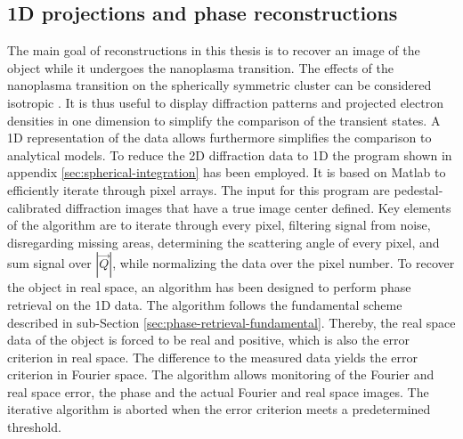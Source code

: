 \subsection{1D projections and phase reconstructions}\label{sec:1d-proj-and-phase-reconstruction}
The main goal of reconstructions in this thesis is to recover an image of the object while it undergoes the nanoplasma transition. The effects of the nanoplasma transition on the spherically symmetric cluster can be considered isotropic \citep{Gorkhover-2016-NatPho}. It is thus useful to display diffraction patterns and projected electron densities in one dimension to simplify the comparison of the transient states. A 1D representation of the data allows furthermore simplifies the comparison to analytical models. To reduce the 2D diffraction data to 1D the program shown in appendix \ref{sec:spherical-integration} has been employed. It is based on Matlab to efficiently iterate through pixel arrays. The input for this program are pedestal-calibrated diffraction images that have a true image center defined. Key elements of the algorithm are to iterate through every pixel, filtering signal from noise, disregarding missing areas, determining the scattering angle of every pixel, and sum signal over $\left|\vec{Q}\right|$, while normalizing the data over the pixel number. To recover the object in real space, an algorithm has been designed to perform phase retrieval on the 1D data.
The algorithm follows the fundamental scheme described in sub-Section \ref{sec:phase-retrieval-fundamental}. Thereby, the real space data of the object is forced to be real and positive, which is also the error criterion in real space. The difference to the measured data yields the error criterion in Fourier space. The algorithm allows monitoring of the Fourier and real space error, the phase and the actual Fourier and real space images. The iterative algorithm is aborted when the error criterion meets a predetermined threshold.
%
%
%
